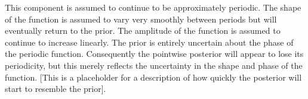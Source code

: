 This component is assumed to continue to be approximately periodic.
The shape of the function is assumed to vary very smoothly between periods but will eventually return to the prior.
The amplitude of the function is assumed to continue to increase linearly.
The prior is entirely uncertain about the phase of the periodic function.
Consequently the pointwise posterior will appear to lose its periodicity, but this merely reflects the uncertainty in the shape and phase of the function.
[This is a placeholder for a description of how quickly the posterior will start to resemble the prior].